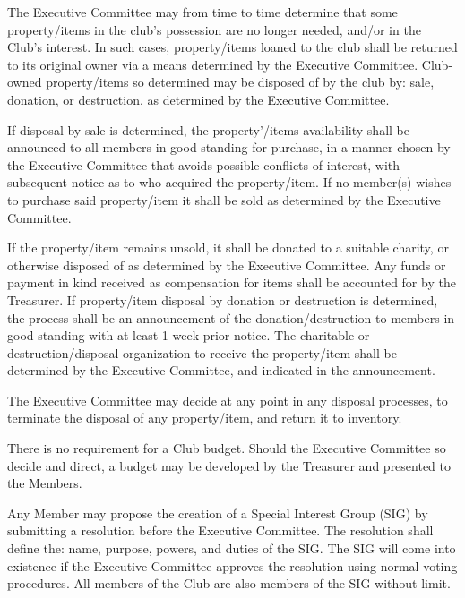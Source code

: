 \documentclass{bylaws}
\begin{document}
The Executive Committee may from time to time determine that some property/items in the club's possession are no longer needed, and/or in the Club's interest. In such cases, property/items loaned to the club shall be returned to its original owner via a means determined by the Executive Committee. Club-owned property/items so determined may be disposed of by the club by: sale, donation, or destruction, as determined by the Executive Committee.

If disposal by sale is determined, the property'/items availability shall be announced to all members in good standing for purchase, in a manner chosen by the Executive Committee that avoids possible conflicts of interest, with subsequent notice as to who acquired the property/item. If no member(s) wishes to purchase said property/item it shall be sold as determined by the Executive Committee.

If the property/item remains unsold, it shall be donated to a suitable charity, or otherwise disposed of as determined by the Executive Committee. Any funds or payment in kind received as compensation for items shall be accounted for by the Treasurer. If property/item disposal by donation or destruction is determined, the process shall be an announcement of the donation/destruction to members in good standing with at least 1 week prior notice. The charitable or destruction/disposal organization to receive the property/item shall be determined by the Executive Committee, and indicated in the announcement.

The Executive Committee may decide at any point in any disposal processes, to terminate the disposal of any property/item, and return it to inventory.

There is no requirement for a Club budget. Should the Executive Committee so decide and direct, a budget may be developed by the Treasurer and presented to the Members. 



Any Member may propose the creation of a Special Interest Group (SIG) by submitting a resolution before the Executive Committee. The resolution shall define the: name, purpose, powers, and duties of the SIG. The SIG will come into existence if the Executive Committee approves the resolution using normal voting procedures. All members of the Club are also members of the SIG without limit. 
\end{document}
